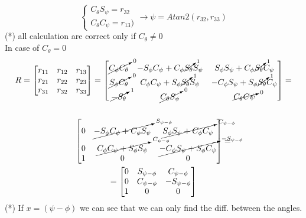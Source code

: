 \documentclass{article}
\begin{document}
\begin{enumerate}
    \begin{equation}
    \begin{cases}
         C_\theta S_\psi = r_{32} \\
         C_\theta C_\psi = r_{13}   )
    \end{cases} \xrightarrow[]{}
     \psi = Atan2(r_{32}, r_{33} )
    \end{equation}
    (*) all calculation are correct only if $C_\theta \ne 0$\\

    In case of $C_\theta = 0$\\

     \begin{multline*}
     R =
        \begin{bmatrix}
        r_{11} & r_{12} & r_{13} \\
        r_{21} & r_{22} & r_{23} \\
        r_{31} & r_{32} & r_{33}
        \end{bmatrix} =
        \begin{bmatrix}
         \cancelto{0}{C_\phi C_\theta}  & -S_\phi C_\psi + C_\phi \cancelto{1}{S_\theta} S_\psi & S_\phi S_\psi + C_\phi \cancelto{1}{S_\theta} C_\psi \\
        \cancelto{0}{S_\phi C_\theta} & C_\phi C_\psi + S_\phi \cancelto{1}{S_\theta} S_\psi & -C_\phi S_\psi + S_\phi \cancelto{1}{S_\theta} C_\psi \\
        \cancelto{1}{-S_\theta} & \cancelto{0}{C_\theta S_\psi} & \cancelto{0}{C_\theta C\psi}
        \end{bmatrix} =\\
        \\
        \begin{bmatrix}
         0  & \cancelto{S_{\psi-\phi} }{-S_\phi C_\psi + C_\phi  S_\psi} & \cancelto{C_{\psi-\phi} }{S_\phi S_\psi + C_\phi  C_\psi} \\
        0 & \cancelto{C_{\psi-\phi} }{C_\phi C_\psi + S_\phi  S_\psi} & \cancelto{-S_{\psi-\phi} }{-C_\phi S_\psi + S_\phi  C_\psi} \\
        1 & 0 & 0
        \end{bmatrix} = \\
        =
        \begin{bmatrix}
         0  & S_{\psi-\phi}  & C_{\psi-\phi} \\
        0 & C_{\psi-\phi} & -S_{\psi-\phi}  \\
        1 & 0 & 0
        \end{bmatrix}
     \end{multline*}
     (*) If $x=(\psi - \phi)$ we can see that we can only find the diff. between the angles.\\


\end{enumerate}
\end{document}
